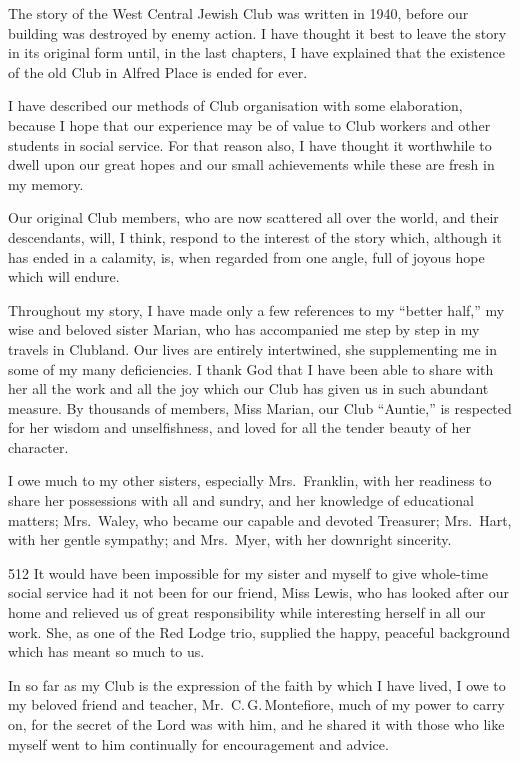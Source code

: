 \cleardoublepage
\tableofcontents*

{
The story of the West Central Jewish Club was written
in 1940, before our building was destroyed by enemy
action. I have thought it best to leave the story in its
original form until, in the last chapters, I have explained
that the existence of the old Club in Alfred Place is
ended for ever.

I have described our methods of Club organisation
with some elaboration, because I hope that our experience
may be of value to Club workers and other students
in social service. For that reason also, I have thought it
worthwhile to dwell upon our great hopes and our small
achievements while these are fresh in my memory.

Our original Club members, who are now scattered
all over the world, and their descendants, will, I think,
respond to the interest of the story which, although it has
ended in a calamity, is, when regarded from one angle,
full of joyous hope which will endure.

Throughout my story, I have made only a few references
to my “better half,” my wise and beloved sister
Marian, who has accompanied me step by step in my
travels in Clubland. Our lives are entirely intertwined,
she supplementing me in some of my many deficiencies.
I thank God that I have been able to share with her all
the work and all the joy which our Club has given us in
such abundant measure. By thousands of members, Miss
Marian, our Club “Auntie,” is respected for her wisdom
and unselfishness, and loved for all the tender beauty of
her character.

I owe much to my other sisters, especially Mrs.\ Franklin,
with her readiness to share her possessions with all
and sundry, and her knowledge of educational matters;
Mrs.\ Waley, who became our capable and devoted
Treasurer; Mrs.\ Hart, with her gentle sympathy; and
Mrs.\ Myer, with her downright sincerity.

\begin{tp}{512}
It would have been impossible for my sister and myself
to give whole-time social service had it not been for our
friend, Miss Lewis, who has looked after our home and
relieved us of great responsibility while interesting herself
in all our work. She, as one of the Red Lodge trio, supplied
the happy, peaceful background which has meant
so much to us.
\end{tp}

In so far as my Club is the expression of the faith by
which I have lived, I owe to my beloved friend and
teacher, Mr.\ C.\,G.\,Montefiore, much of my power to
carry on, for the secret of the Lord was with him, and
he shared it with those who like myself went to him continually
for encouragement and advice.

}
